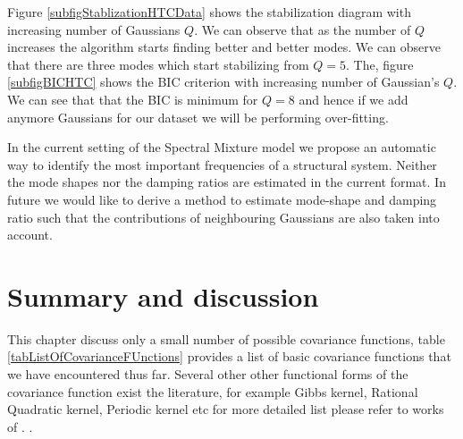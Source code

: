 Figure \ref{subfigStablizationHTCData} shows the stabilization diagram with increasing number of Gaussians $Q$. We can observe that as the number of $Q$ increases the algorithm starts finding better and better modes. We can observe that there are three modes which start stabilizing from $Q=5$. The, figure \ref{subfigBICHTC} shows the BIC criterion with increasing number of Gaussian's $Q$. We can see that that the BIC is minimum for $Q=8$ and hence if we add anymore Gaussians for our dataset we will be performing over-fitting. 

In the current setting of the Spectral Mixture model we propose an automatic way to identify the most important frequencies of a structural system. Neither the mode shapes nor the damping ratios are estimated in the current format. In future we would like to derive a method to estimate mode-shape and damping ratio such that the contributions of neighbouring Gaussians are also taken into account. 

\section{Summary and discussion}
This chapter discuss only a small number of possible covariance functions, table \ref{tabListOfCovarianceFUnctions} provides a list of basic covariance functions that we have encountered thus far. Several other other functional forms of the covariance function exist the literature, for example Gibbs kernel, Rational Quadratic kernel, Periodic kernel etc for more detailed list please refer to works of \cite{Rasmussen2005, duvenaud2013structure, wilson2014thesis}. . 

